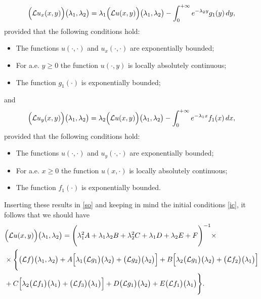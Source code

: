 \documentclass{amsart}
\theoremstyle{definition}
\theoremstyle{remark}
\numberwithin{equation}{section}
\begin{document}
\begin{align*} 
\Bigl({\mathcal L}u_{x}(x,y)\Bigr)\bigl( \lambda_{1},\lambda_{2} \bigr)=  \lambda_{1}\Bigl({\mathcal L}u(x,y)\Bigr)\bigl( \lambda_{1},\lambda_{2} \bigr)- \int^{+\infty}_{0}e^{-\lambda_{2}y} g_{1}(y)  \, dy,
\end{align*}
provided that the following conditions hold:
\begin{itemize}
\item[(x1)] The functions $u(\cdot, \cdot)$ and $u_{x}(\cdot, \cdot)$ are exponentially bounded; 
\item[(x2)] For a.e. $y\geq 0$ the function $u(\cdot,y)$ is locally absolutely continuous;
\item[(x3)] The function $g_{1}( \cdot)$ is exponentially bounded;
\end{itemize}
and
\begin{align*} 
\Bigl({\mathcal L}u_{y}(x,y)\Bigr)\bigl( \lambda_{1},\lambda_{2} \bigr)= \lambda_{2}\Bigl({\mathcal L}u(x,y)\Bigr)\bigl( \lambda_{1},\lambda_{2} \bigr)- \int^{+\infty}_{0}e^{-\lambda_{1}x} f_{1}(x)  \, dx,
\end{align*}
provided that the following conditions hold:
\begin{itemize}
\item[(y1)] The functions $u(\cdot, \cdot)$ and $u_{y}(\cdot, \cdot)$ are exponentially bounded; 
\item[(y2)] For a.e. $x\geq 0$ the function $u(x,\cdot )$ is locally absolutely continuous;
\item[(y3)] The function $f_{1}( \cdot)$ is exponentially bounded.
\end{itemize}
Inserting these results in \eqref{so} and keeping in mind the initial conditions \eqref{ic}, it follows that we should have
\begin{align}\notag &
\Bigl({\mathcal L}u(x,y) \Bigr)\bigl( \lambda_{1},\lambda_{2} \bigr)= \Biggl( \lambda_{1}^{2}A+\lambda_{1}\lambda_{2}B+\lambda_{2}^{2}C+ \lambda_{1}D+\lambda_{2}E+F\Biggr)^{-1}\times
\\\notag & \times \Biggl\{ \bigl({\mathcal L}f \bigr)\bigl( \lambda_{1},\lambda_{2} \bigr)+A\Bigl[ \lambda_{1}\bigl({\mathcal L} g_{1}\bigr)\bigl( \lambda_{2} \bigr)+\bigl({\mathcal L} g_{2}\bigr)\bigl( \lambda_{2} \bigr)\Bigr]+B\Bigl[\lambda_{2}\bigl({\mathcal L} g_{1}\bigr)\bigl( \lambda_{2} \bigr)+\bigl({\mathcal L}f_{2} \bigr)\bigl( \lambda_{1} \bigr) \Bigr]
\\\label{smiljana}& +C\Bigl[ \lambda_{2}\bigl({\mathcal L} f_{1}\bigr)\bigl( \lambda_{1} \bigr)+\bigl({\mathcal L} f_{3}\bigr)\bigl( \lambda_{1}\bigr) \Bigr]+D\bigl({\mathcal L}g_{1} \bigr)\bigl( \lambda_{2} \bigr)+E\bigl({\mathcal L}f_{1} \bigr)\bigl( \lambda_{1}\bigr)\Biggr\}.
\end{align}
 
\end{document}
